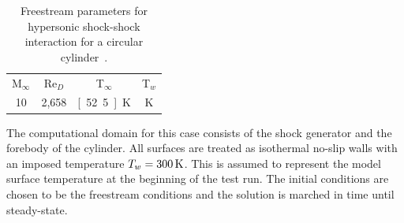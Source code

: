 \begin{table}[hbtp]
  \begin{center}
    \caption[Freestream parameters for hypersonic shock-shock interaction for a circular cylinder.]{Freestream parameters for hypersonic shock-shock interaction for a circular cylinder~\cite{onera-dsmc-type4}.\label{table:ssi-freestream-parameters}}
    \vspace{1em}
    \begin{tabular}{cccc} \hline \hline
      M$_\infty$ & Re$_D$  & T$_\infty$ & T$_w$    \\
      10         &   2,658 & \unit[52.5]{K}   & \unit[300]{K}  \\ \hline
    \end{tabular}
  \end{center}
\end{table}

The computational domain for this case consists of the shock generator and the forebody of the cylinder.  All surfaces are treated as isothermal no-slip walls with an imposed temperature $T_w=\unit[300]{K}$.  This is assumed to represent the model surface temperature at the beginning of the test run.  The initial conditions are chosen to be the freestream conditions and the solution is marched in time until steady-state.  

